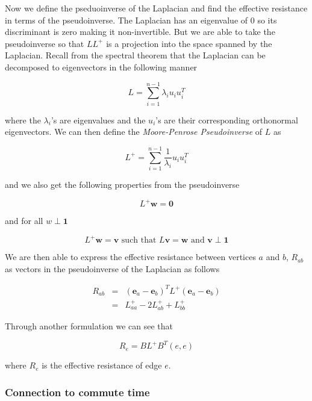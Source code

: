 \documentclass[12pt,twoside]{article}
\newcommand{\mbf}{\mathbf}
\begin{document}


Now we define the pseduoinverse of the Laplacian and find the effective resistance in terms of the pseudoinverse. The Laplacian has an eigenvalue of 0 so its discriminant is zero making it non-invertible. But we are able to take the pseudoinverse so that $LL^+$ is a projection into the space spanned by the Laplacian. Recall from the spectral theorem that the Laplacian can be decomposed to eigenvectors in the following manner

\begin{equation}
L = \sum_{i=1}^{n-1} \lambda_i u_i u_i^T
\end{equation}

where the $\lambda_i$'s are eigenvalues and the $u_i$'s are their corresponding orthonormal eigenvectors. We can then define the \textit{Moore-Penrose Pseudoinverse} of $L$ as

\begin{equation}
L^+ = \sum_{i=1}^{n-1} \frac{1}{\lambda_i}u_i u_i^T
\end{equation}

and we also get the following properties from the pseudoinverse

$$
L^+ \mathbf{w} = \mathbf{0}
$$

and for all $w \perp \mathbf{1}$

$$
L^+ \mbf{w} = \mbf{v} \text{ such that } L\mbf{v} = \mbf{w} \text{ and } \mbf{v} \perp \mbf{1}
$$

We are then able to express the effective resistance between vertices $a$ and $b$, $R_{ab}$ as vectors in the pseudoinverse of the Laplacian as follows

\begin{eqnarray}
R_{ab} &=& (\mbf{e}_a - \mbf{e}_b)^T L^+ (\mbf{e}_a - \mbf{e}_b) \\
       &=&  L^+_{aa} -2L^+_{ab} + L^+_{bb} 
\end{eqnarray}

Through another formulation we can see that 

\begin{equation}
R_e = B L^+ B^T(e,e)
\end{equation}

where $R_e$ is the effective resistance of edge $e$.

\subsubsection{Connection to commute time}
\end{document}
